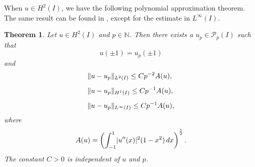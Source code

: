 \documentclass[english, 12pt, a4paper, sci, utf8, a-2b, online]{aaltothesis}
\theoremstyle{definition}
\theoremstyle{plain}
\newtheorem{theorem}{Theorem}[section]
\DeclarePairedDelimiter\abs{\lvert}{\rvert}
\DeclarePairedDelimiter\norm{\lVert}{\rVert}
\newcommand*\diff{\mathop{}\!d}
\numberwithin{equation}{section}
\begin{document}
When $u \in H^2(I)$, we have the following polynomial approximation theorem.
The same result can be found in \cite[Lemma 3.3]{babuskasuri1987},
except for the estimate in $L^{\infty}(I)$.
\begin{theorem}
    \label{thm:polynomial_approximation_1d}
    Let $u \in H^2(I)$ and $p \in \mathbb{N}$.
    Then there exists a $u_p \in \mathcal{P}_p(I)$ such that
    \begin{equation}
        \label{eq:polynomial_approximation_1d_endpoint_equality}
        u(\pm 1) = u_p(\pm 1)
    \end{equation}
    and
    \begin{align}
        \label{eq:polynomial_approximation_1d_res1}
        &\norm{u-u_p}_{L^2(I)} \leq C p^{-2} A(u), \\[0.5em]
        \label{eq:polynomial_approximation_1d_res2}
        &\norm{u-u_p}_{H^1(I)} \leq C p^{-1} A(u), \\[0.5em]
        \label{eq:polynomial_approximation_1d_res3}
        &\norm{u-u_p}_{L^{\infty}(I)} \leq C p^{-1} A(u),
    \end{align}
    where
    \begin{equation*}
        A(u) = \left(
            \int_{-1}^{1} \abs{u''(x)}^2 (1-x^2) \diff x
            \right)^{\frac{1}{2}}.
    \end{equation*}
    The constant $C > 0$ is independent of $u$ and $p$.
\end{theorem}
\end{document}
